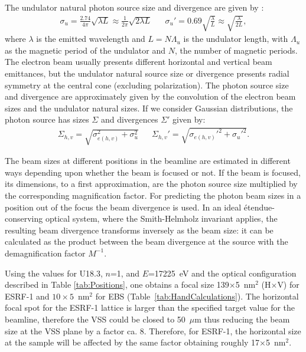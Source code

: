 \documentclass{iucr}              %
\newcommand{\inred}[1]{{\color{red}#1}}
\begin{document}
The undulator natural photon source size and divergence are given by \cite{elleaume}:
\begin{align}
    \label{eq:photon small sigmas}
    \sigma_u=\frac{2.74}{4\pi}\sqrt{\lambda L}\approx \frac{1}{2  \pi}\sqrt{2 \lambda L}  && \sigma_u' = 0.69\sqrt{\frac{\lambda}{L}}\approx \sqrt{\frac{\lambda}{2 L}},
\end{align}
where $\lambda$ is the emitted wavelength and $L=N\Lambda_u$ is the undulator length, with $\Lambda_u$ as the magnetic period of the undulator and $N$, the number of magnetic periods. The electron beam usually presents different horizontal and vertical beam emittances, but the undulator natural source size or divergence presents radial symmetry at the central cone (excluding polarization). The photon source size and divergence are approximately given by the convolution of the electron beam sizes and the undulator natural sizes. If we consider Gaussian distributions, the photon source has sizes $\Sigma$ and divergences $\Sigma'$ given by:
\begin{align}
\label{eq:photon big sigmas}
\Sigma_{h,v}=\sqrt{\sigma_{e(h,v)}^2 + \sigma_u^2} && \Sigma_{h,v}'=\sqrt{\sigma_{e(h,v)}'^2 + \sigma_u'^2}.
\end{align}

The beam sizes at different positions in the beamline are estimated in different ways depending upon whether the beam is focused or not. If the beam is focused, its dimensions, to a first approximation, are the photon source size multiplied by the corresponding magnification factor. For predicting the photon beam sizes in a position out of the focus the beam divergence is used. In an ideal {\'{e}}tendue-conserving optical system, where the Smith-Helmholz invariant applies, the resulting beam divergence transforms inversely as the beam size: it can be calculated as the product between the beam divergence at the source with the demagnification factor $M^{-1}$.

Using the values for U18.3, $n$=1, and  $E$=17225~eV and the optical configuration described in Table \ref{tab:Positions}, one obtains a focal size 139$\times$5~nm$^2$ (H$\times$V) for ESRF-1 and $10\times5$~nm$^2$ for EBS (Table~\ref{tab:HandCalculations}). The horizontal focal spot for the ESRF-1 lattice is larger than the specified target value for the beamline, therefore the VSS could be closed to 50~$\mu$m thus reducing the beam size at the VSS plane by a factor ca. 8.
Therefore, for ESRF-1, the horizontal size at the sample will be affected by the same factor obtaining roughly 17$\times$5~nm$^2$.
\end{document}

